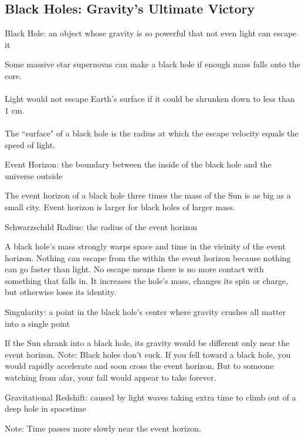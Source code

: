 \documentclass[12pt]{article}
\begin{document}
\subsection{Black Holes: Gravity's Ultimate Victory}
\begin{definition} Black Hole: an object whose gravity is so powerful that not even light can escape it \end{definition} 
Some massive star supernovas can make a black hole if enough mass falls onto the core. \\~\\
Light would not escape Earth's surface if it could be shrunken down to less than 1 cm. \\~\\
The ``surface" of a black hole is the radius at which the escape velocity equals the speed of light. 
\begin{definition} Event Horizon: the boundary between the inside of the black hole and the universe outside \end{definition} 
The event horizon of a black hole three times the mass of the Sun is as big as a small city. Event horizon is larger for black holes of larger mass. 
\begin{definition} Schwarzschild Radius: the radius of the event horizon \end{definition} 
A black hole's mass strongly warps space and time in the vicinity of the event horizon. Nothing can escape from the within the event horizon because nothing can go faster than light. No escape means there is no more contact with something that falls in. It increases the hole's mass, changes its spin or charge, but otherwise loses its identity. 
\begin{definition} Singularity: a point in the black hole's center where gravity crushes all matter into a single point \end{definition} 
If the Sun shrank into a black hole, its gravity would be different only near the event horizon. Note: Black holes don't suck. If you fell toward a black hole, you would rapidly accelerate and soon cross the event horizon. But to someone watching from afar, your fall would appear to take forever. 
\begin{definition} Gravitational Redshift: caused by light waves taking extra time to climb out of a deep hole in spacetime \end{definition} 
Note: Time passes more slowly near the event horizon. \\~\\
\end{document}
